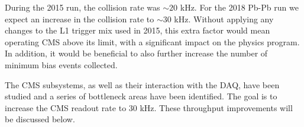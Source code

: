 During the 2015 run, the collision rate was $\sim 20$ kHz. For the 2018 Pb-Pb run we expect an increase in the collision
rate to $\sim 30$ kHz. Without applying any changes to the L1 trigger mix used in 2015, this extra factor would mean
operating CMS above its limit, with a significant impact on the physics program. In addition, it would be beneficial to also further increase the number of minimum bias events collected.

The CMS subsystems, as well as their interaction with the DAQ, have been studied and a series of bottleneck areas have
been identified. The goal is to increase the CMS readout rate to 30 kHz. These throughput improvements
will be discussed below.
